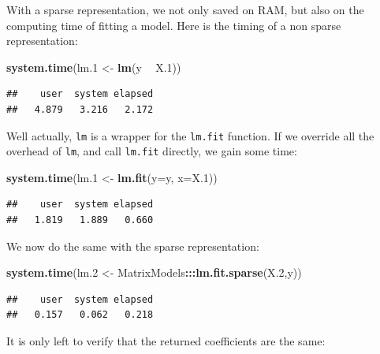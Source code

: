 \documentclass[]{book}
\newenvironment{Shaded}{\begin{snugshade}}{\end{snugshade}}
\newcommand{\DataTypeTok}[1]{\textcolor[rgb]{0.13,0.29,0.53}{#1}}
\newcommand{\FloatTok}[1]{\textcolor[rgb]{0.00,0.00,0.81}{#1}}
\newcommand{\KeywordTok}[1]{\textcolor[rgb]{0.13,0.29,0.53}{\textbf{#1}}}
\newcommand{\NormalTok}[1]{#1}
\newcommand{\OperatorTok}[1]{\textcolor[rgb]{0.81,0.36,0.00}{\textbf{#1}}}
\newcommand{\StringTok}[1]{\textcolor[rgb]{0.31,0.60,0.02}{#1}}
\theoremstyle{definition}
\theoremstyle{definition}
\theoremstyle{definition}
\theoremstyle{remark}
\begin{document}
With a sparse representation, we not only saved on RAM, but also on the computing time of fitting a model.
Here is the timing of a non sparse representation:

\begin{Shaded}
\begin{Highlighting}[]
\KeywordTok{system.time}\NormalTok{(lm}\FloatTok{.1}\NormalTok{ <-}\StringTok{ }\KeywordTok{lm}\NormalTok{(y }\OperatorTok{~}\StringTok{ }\NormalTok{X}\FloatTok{.1}\NormalTok{)) }
\end{Highlighting}
\end{Shaded}

\begin{verbatim}
##    user  system elapsed 
##   4.879   3.216   2.172
\end{verbatim}

Well actually, \texttt{lm} is a wrapper for the \texttt{lm.fit} function.
If we override all the overhead of \texttt{lm}, and call \texttt{lm.fit} directly, we gain some time:

\begin{Shaded}
\begin{Highlighting}[]
\KeywordTok{system.time}\NormalTok{(lm}\FloatTok{.1}\NormalTok{ <-}\StringTok{ }\KeywordTok{lm.fit}\NormalTok{(}\DataTypeTok{y=}\NormalTok{y, }\DataTypeTok{x=}\NormalTok{X}\FloatTok{.1}\NormalTok{))}
\end{Highlighting}
\end{Shaded}

\begin{verbatim}
##    user  system elapsed 
##   1.819   1.889   0.660
\end{verbatim}

We now do the same with the sparse representation:

\begin{Shaded}
\begin{Highlighting}[]
\KeywordTok{system.time}\NormalTok{(lm}\FloatTok{.2}\NormalTok{ <-}\StringTok{ }\NormalTok{MatrixModels}\OperatorTok{:::}\KeywordTok{lm.fit.sparse}\NormalTok{(X}\FloatTok{.2}\NormalTok{,y))}
\end{Highlighting}
\end{Shaded}

\begin{verbatim}
##    user  system elapsed 
##   0.157   0.062   0.218
\end{verbatim}

It is only left to verify that the returned coefficients are the same:
\end{document}
